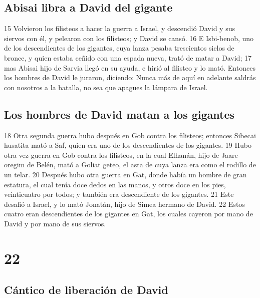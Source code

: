 \section*{Abisai libra a David del gigante}

15 Volvieron los filisteos a hacer la guerra a Israel, y descendió David y sus siervos con él, y pelearon con los filisteos; y David se cansó.
16 E Isbi-benob, uno de los descendientes de los gigantes, cuya lanza pesaba trescientos siclos de bronce,  y quien estaba ceñido con una espada nueva, trató de matar a David;
17 mas Abisai hijo de Sarvia llegó en su ayuda, e hirió al filisteo y lo mató. Entonces los hombres de David le juraron, diciendo: Nunca más de aquí en adelante saldrás con nosotros a la batalla, no sea que apagues la lámpara de Israel.

\section*{Los hombres de David matan a los gigantes}

18 Otra segunda guerra hubo después en Gob contra los filisteos; entonces Sibecai husatita mató a Saf, quien era uno de los descendientes de los gigantes.
19 Hubo otra vez guerra en Gob contra los filisteos, en la cual Elhanán, hijo de Jaare-oregim de Belén, mató a Goliat geteo, el asta de cuya lanza era como el rodillo de un telar.
20 Después hubo otra guerra en Gat, donde había un hombre de gran estatura, el cual tenía doce dedos en las manos, y otros doce en los pies, veinticuatro por todos; y también era descendiente de los gigantes.
21 Este desafió a Israel, y lo mató Jonatán, hijo de Simea hermano de David.
22 Estos cuatro eran descendientes de los gigantes en Gat, los cuales cayeron por mano de David y por mano de sus siervos.

\chapter{22}

\section*{Cántico de liberación de David}

